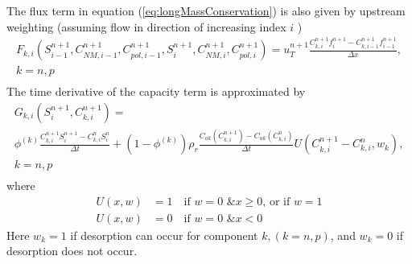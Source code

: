 \documentclass[energies,article,submit,moreauthors,pdftex]{Definitions/mdpi}
\begin{document}
The flux term in equation (\ref{eq:longMassConservation}) is also given by upstream weighting (assuming flow in direction of increasing index $i$ )
\begin{equation}
\begin{split}
    F_{k,i}\left(S^{n+1}_{i-1}, C^{n+1}_{\textit{NM}, i-1}, C^{n+1}_{pol, i-1}, S^{n+1}_{i}, C^{n+1}_{\textit{NM}, i}, C^{n+1}_{pol, i}\right) = u_T^{n+1} \frac{C^{n+1}_{k,i} f^{n+1}_{i} - C^{n+1}_{k,i-1} f^{n+1}_{i-1}}{\Delta x},\\  k=n,p \\ \quad
\end{split}
\end{equation}
The time derivative of the capacity term is approximated by
\begin{multline}
    G_{k,i}\left(S^{n+1}_{i}, C^{n+1}_{k,i}\right) = \\ 
    \phi^{(k)} \frac{C^{n+1}_{k,i} S^{n+1}_{i} - C^{n}_{k,i} S^{n}_{i}}{\Delta t} + \left(1-\phi^{(k)}\right) \rho_r 
    \frac{C_{ak} \left(C^{n+1}_{k,i}\right) - C_{ak} \left(C^{n}_{k,i}\right)}{\Delta t} U \left(C^{n+1}_{k,i} - C^{n}_{k,i}, w_k \right)
    ,\\ k=n,p \\ \quad
\end{multline}
where
\begin{equation*}
\begin{split}
    U(x,w) &= 1     \quad \text{if } w=0 \text{ \& } x\geq0 \text{, or if } w=1 \\
    U(x,w) &= 0     \quad \text{if } w=0 \text{ \& } x<0 
\end{split}
\end{equation*}
Here  $w_k=1$ if desorption can occur for component $k, (k=n,p)$, and $w_k=0$  if desorption does not occur.
\end{document}
